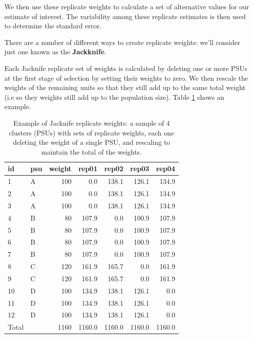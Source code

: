 \documentclass[
]{book}
\begin{document}
We then use these replicate weights to calculate a set of alternative
values for our estimate of interest. The variability among these replicate
estimates is then used to determine the standard error.

There are a number of different ways to create replicate weights: we'll consider just one
known as the \textbf{Jackknife}.

Each Jacknife replicate set of weights is calculated by deleting one or more PSUs at
the first stage of selection by setting their weights to zero. We then rescale the
weights of the remaining units so that they still add up to the same total weight (i.e so
they weights still add up to the population size). Table \ref{tab:examplejk} shows an example.

\begin{table}
\centering
\caption{\label{tab:examplejk}Example of Jacknife replicate weights: a sample of 4 clusters (PSUs) with sets of replicate weights, each one deleting the weight of a single PSU, and rescaling to maintain the total of the weights.}
\centering
\begin{tabular}[t]{l|l|r|r|r|r|r}
\hline
id & psu & weight & rep01 & rep02 & rep03 & rep04\\
\hline
1 & A & 100 & 0.0 & 138.1 & 126.1 & 134.9\\
\hline
2 & A & 100 & 0.0 & 138.1 & 126.1 & 134.9\\
\hline
3 & A & 100 & 0.0 & 138.1 & 126.1 & 134.9\\
\hline
4 & B & 80 & 107.9 & 0.0 & 100.9 & 107.9\\
\hline
5 & B & 80 & 107.9 & 0.0 & 100.9 & 107.9\\
\hline
6 & B & 80 & 107.9 & 0.0 & 100.9 & 107.9\\
\hline
7 & B & 80 & 107.9 & 0.0 & 100.9 & 107.9\\
\hline
8 & C & 120 & 161.9 & 165.7 & 0.0 & 161.9\\
\hline
9 & C & 120 & 161.9 & 165.7 & 0.0 & 161.9\\
\hline
10 & D & 100 & 134.9 & 138.1 & 126.1 & 0.0\\
\hline
11 & D & 100 & 134.9 & 138.1 & 126.1 & 0.0\\
\hline
12 & D & 100 & 134.9 & 138.1 & 126.1 & 0.0\\
\hline
Total &  & 1160 & 1160.0 & 1160.0 & 1160.0 & 1160.0\\
\hline
\end{tabular}
\end{table}
\end{document}
